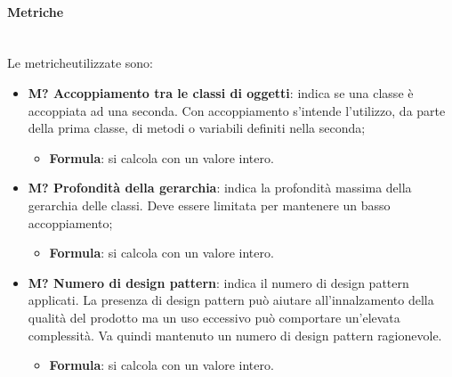 		\paragraph*{Metriche}\mbox{}\\ [1mm]
		Le metriche\glosp utilizzate sono:
		\begin{itemize}
			\item \textbf{M? Accoppiamento tra le classi di oggetti}: indica se una classe è accoppiata ad una seconda. Con accoppiamento s'intende l'utilizzo, da parte della prima classe, di metodi o variabili definiti nella seconda; 
			\begin{itemize}
				\item[] \textbf{Formula}: si calcola con un valore intero.
			\end{itemize}
			\item \textbf{M? Profondità della gerarchia}: indica la profondità massima della gerarchia delle classi. Deve essere limitata per mantenere un basso accoppiamento;
			\begin{itemize}
				\item[] \textbf{Formula}: si calcola con un valore intero.
			\end{itemize} 	
			\item \textbf{M? Numero di design pattern}: indica il numero di design pattern applicati. La presenza di design pattern può aiutare all'innalzamento della qualità del prodotto ma un uso eccessivo può comportare un'elevata complessità. Va quindi mantenuto un numero di design pattern ragionevole.
			\begin{itemize}
				\item[] \textbf{Formula}: si calcola con un valore intero.
			\end{itemize} 	
		\end{itemize}
		

